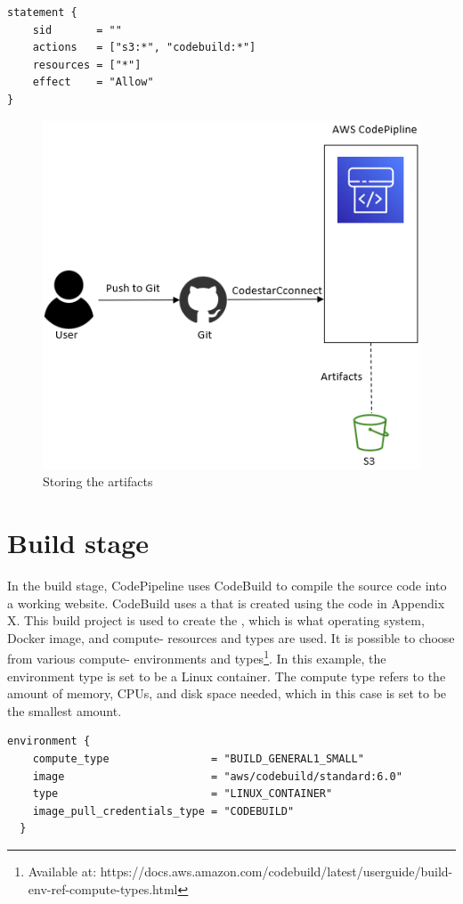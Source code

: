 \begin{tcolorbox}
\begin{verbatim}
statement {
    sid       = ""
    actions   = ["s3:*", "codebuild:*"]
    resources = ["*"]
    effect    = "Allow"
}
\end{verbatim}
\end{tcolorbox}

\vspace{2mm}
\begin{figure}[H]
    \centering
    \includegraphics[width=0.6\columnwidth]{Images/aws-piplin-2.png}
    \caption{Storing the artifacts}
    \label{fig: Storing the artifacts}
\end{figure}

\section{Build stage}
In the build stage, CodePipeline uses CodeBuild to compile the source code into a working website. CodeBuild uses a  that is created using the code in Appendix X. This build project is used to create the , which is what operating system, Docker image, and compute- resources and types are used.  It is possible to choose from various compute- environments and types\footnote{Available at: https://docs.aws.amazon.com/codebuild/latest/userguide/build-env-ref-compute-types.html}. In this example, the environment type is set to be a Linux container. The compute type refers to the amount of memory, CPUs, and disk space needed, which in this case is set to be the smallest amount. 

\begin{tcolorbox}
\begin{verbatim}
environment {
    compute_type                = "BUILD_GENERAL1_SMALL"
    image                       = "aws/codebuild/standard:6.0"
    type                        = "LINUX_CONTAINER"
    image_pull_credentials_type = "CODEBUILD"
  }
\end{verbatim}
\end{tcolorbox}


